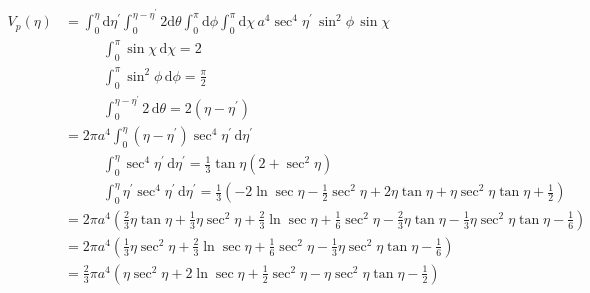 \documentclass[12pt]{article}
\begin{document}
\begin{equation}
\begin{split}
V_p(\eta) &= \int_0^\eta \! \mathrm d \eta^\prime \int_0^{\eta - \eta^\prime} \! 2\mathrm d \theta \int_0^\pi \! \mathrm d \phi \int_0^\pi \! \mathrm d \chi \, a^4\sec^4\eta^\prime \, \sin^2\phi \, \sin\chi \\
  & \;\;\;\;\;\;\;\;\;\; \int_0^\pi \! \sin\chi \, \mathrm d \chi = 2 \\
  & \;\;\;\;\;\;\;\;\;\; \int_0^\pi \! \sin^2\phi \, \mathrm d \phi = \frac{\pi}{2} \\
  & \;\;\;\;\;\;\;\;\;\; \int_0^{\eta - \eta^\prime} \! 2\,\mathrm d\theta = 2\left(\eta - \eta^\prime\right) \\
  &= 2\pi a^4 \int_0^\eta \! \left(\eta - \eta^\prime\right)\sec^4\eta^\prime\,\mathrm d\eta^\prime \\
  & \;\;\;\;\;\;\;\;\;\; \int_0^\eta \! \sec^4\eta^\prime \, \mathrm d\eta^\prime = \frac{1}{3}\tan\eta\left(2+\sec^2\eta\right) \\
  & \;\;\;\;\;\;\;\;\;\; \int_0^\eta \! \eta^\prime\sec^4\eta^\prime\,\mathrm d\eta^\prime = \frac{1}{3}\left(-2\ln\sec\eta - \frac{1}{2}\sec^2\eta + 2\eta\tan\eta + \eta\sec^2\eta\tan\eta + \frac{1}{2}\right) \\
  &= 2\pi a^4\left(\frac{2}{3}\eta\tan\eta + \frac{1}{3}\eta\sec^2\eta + \frac{2}{3}\ln\sec\eta + \frac{1}{6}\sec^2\eta - \frac{2}{3}\eta\tan\eta - \frac{1}{3}\eta\sec^2\eta\tan\eta - \frac{1}{6}\right) \\
  &= 2\pi a^4\left(\frac{1}{3}\eta\sec^2\eta + \frac{2}{3}\ln\sec\eta + \frac{1}{6}\sec^2\eta - \frac{1}{3}\eta\sec^2\eta\tan\eta - \frac{1}{6}\right) \\
  &= \frac{2}{3}\pi a^4 \left(\eta\sec^2\eta + 2\ln\sec\eta + \frac{1}{2}\sec^2\eta - \eta\sec^2\eta\tan\eta - \frac{1}{2}\right)
\end{split}
\end{equation}
\end{document}
